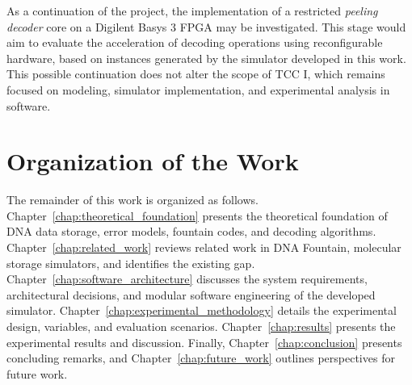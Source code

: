 As a continuation of the project, the implementation of a restricted \emph{peeling decoder} core on a Digilent Basys 3 FPGA may be investigated. This stage would aim to evaluate the acceleration of decoding operations using reconfigurable hardware, based on instances generated by the simulator developed in this work. This possible continuation does not alter the scope of TCC I, which remains focused on modeling, simulator implementation, and experimental analysis in software.

\section{Organization of the Work}

The remainder of this work is organized as follows. Chapter~\ref{chap:theoretical_foundation} presents the theoretical foundation of DNA data storage, error models, fountain codes, and decoding algorithms. Chapter~\ref{chap:related_work} reviews related work in DNA Fountain, molecular storage simulators, and identifies the existing gap. Chapter~\ref{chap:software_architecture} discusses the system requirements, architectural decisions, and modular software engineering of the developed simulator. Chapter~\ref{chap:experimental_methodology} details the experimental design, variables, and evaluation scenarios. Chapter~\ref{chap:results} presents the experimental results and discussion. Finally, Chapter~\ref{chap:conclusion} presents concluding remarks, and Chapter~\ref{chap:future_work} outlines perspectives for future work.